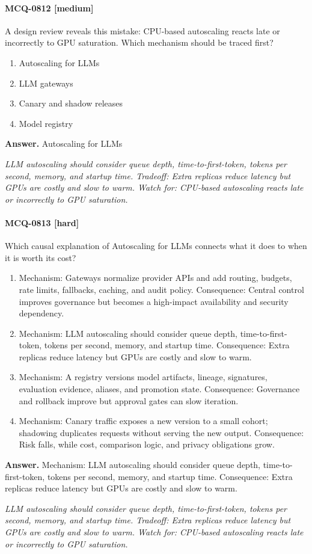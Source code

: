 \paragraph{MCQ-0812 [medium]} A design review reveals this mistake: CPU-based autoscaling reacts late or incorrectly to GPU saturation. Which mechanism should be traced first?
\begin{enumerate}[label=\Alph*.]
\item Autoscaling for LLMs
\item LLM gateways
\item Canary and shadow releases
\item Model registry
\end{enumerate}
\noindent\textbf{Answer.} Autoscaling for LLMs
\par\textit{LLM autoscaling should consider queue depth, time-to-first-token, tokens per second, memory, and startup time. Tradeoff: Extra replicas reduce latency but GPUs are costly and slow to warm. Watch for: CPU-based autoscaling reacts late or incorrectly to GPU saturation.}
\paragraph{MCQ-0813 [hard]} Which causal explanation of Autoscaling for LLMs connects what it does to when it is worth its cost?
\begin{enumerate}[label=\Alph*.]
\item Mechanism: Gateways normalize provider APIs and add routing, budgets, rate limits, fallbacks, caching, and audit policy. Consequence: Central control improves governance but becomes a high-impact availability and security dependency.
\item Mechanism: LLM autoscaling should consider queue depth, time-to-first-token, tokens per second, memory, and startup time. Consequence: Extra replicas reduce latency but GPUs are costly and slow to warm.
\item Mechanism: A registry versions model artifacts, lineage, signatures, evaluation evidence, aliases, and promotion state. Consequence: Governance and rollback improve but approval gates can slow iteration.
\item Mechanism: Canary traffic exposes a new version to a small cohort; shadowing duplicates requests without serving the new output. Consequence: Risk falls, while cost, comparison logic, and privacy obligations grow.
\end{enumerate}
\noindent\textbf{Answer.} Mechanism: LLM autoscaling should consider queue depth, time-to-first-token, tokens per second, memory, and startup time. Consequence: Extra replicas reduce latency but GPUs are costly and slow to warm.
\par\textit{LLM autoscaling should consider queue depth, time-to-first-token, tokens per second, memory, and startup time. Tradeoff: Extra replicas reduce latency but GPUs are costly and slow to warm. Watch for: CPU-based autoscaling reacts late or incorrectly to GPU saturation.}
